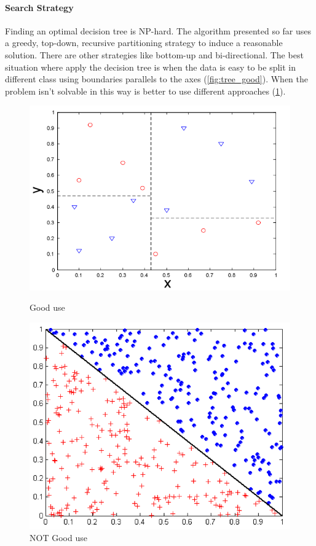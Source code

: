 \documentclass[12pt]{article}
\begin{document}
\paragraph{Search Strategy} Finding an optimal decision tree is NP-hard. The algorithm presented so far uses a greedy, top-down, recursive partitioning strategy to induce a reasonable solution. There are other strategies like bottom-up and bi-directional. The best situation where apply the decision tree is when the data is easy to be split in different class using boundaries parallels to the axes (\ref{fig:tree_good}). When the problem isn't solvable in this way is better to use different approaches (\ref{fig:tree_bad}).
\begin{figure}[h!]
  \centering
  \begin{minipage}{.45\textwidth}
    \centering
    \includegraphics[width=\linewidth]{images/tree_good.png}
    \caption{Good use}
    \label{fig:tree_good}
  \end{minipage}\hfill
  \begin{minipage}{.45\textwidth}
    \centering
    \includegraphics[width=\linewidth]{images/tree_bad.png}
    \caption{NOT Good use}
    \label{fig:tree_bad}
  \end{minipage}\hfill
\end{figure}
\end{document}
